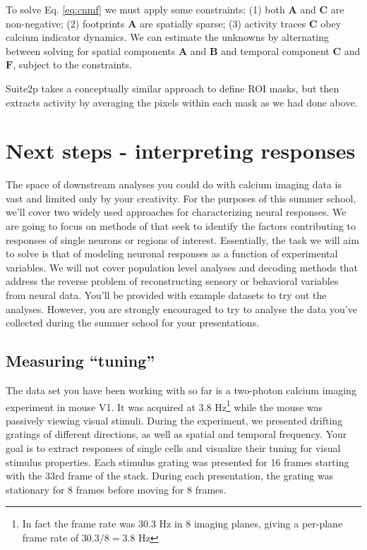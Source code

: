 \documentclass[a4paper]{report}
\begin{document}
To solve Eq. \ref{eq:cnmf} we must apply some constraints: (1) both $\mathbf{A}$ and $\mathbf{C}$ are non-negative; (2) footprints $\mathbf{A}$ are spatially sparse; (3) activity traces $\mathbf{C}$ obey calcium indicator dynamics. We can estimate the unknowns by alternating between solving for spatial components $\mathbf{A}$ and $\mathbf{B}$ and temporal component $\mathbf{C}$ and $\mathbf{F}$, subject to the constraints.

Suite2p takes a conceptually similar approach to define ROI masks, but then extracts activity by averaging the pixels within each mask as we had done above.

\section{Next steps - interpreting responses}
The space of downstream analyses you could do with calcium imaging data is vast and limited only by your creativity. 
For the purposes of this summer school, we'll cover two widely used approaches for characterizing neural responses. 
We are going to focus on methods of that seek to identify the factors contributing to responses of single neurons or regions of interest. 
Essentially, the task we will aim to solve is that of modeling neuronal responses as a function of experimental variables. 
We will not cover population level analyses and decoding methods that address the reverse problem of reconstructing sensory or behavioral variables from neural data. 
You'll be provided with example datasets to try out the analyses. However, you are strongly encouraged to try to analyse the data you've collected during the summer school for your presentations.

\subsection{Measuring ``tuning''}
The data set you have been working with so far is a two-photon calcium imaging experiment in mouse V1. 
It was acquired at 3.8 Hz\footnote{In fact the frame rate was 30.3 Hz in 8 imaging planes, giving a per-plane frame rate of $30.3/8 = 3.8$ Hz} while the mouse was passively viewing visual stimuli.
During the experiment, we presented drifting gratings of different directions, as well as spatial and temporal frequency.
Your goal is to extract responses of single cells and visualize their tuning for visual stimulus properties. 
Each stimulus grating was presented for 16 frames starting with the 33rd frame of the stack.
During each presentation, the grating was stationary for 8 frames before moving for 8 frames.
\end{document}
